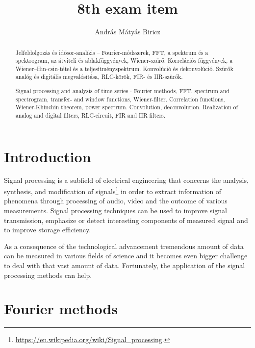 \documentclass[12pt]{article}
\theoremstyle{plain}
\begin{document}
\title{8th exam item}
\author{András Mátyás Biricz}

\maketitle


\begin{abstract}
    \centering

    Jelfeldolgozás és idősor-analízis – Fourier-módszerek, FFT, a spektrum és a spektrogram, az átviteli és ablakfüggvények, Wiener-szűrő. Korrelációs függvények, a Wiener–Hin-csin-tétel és a teljesítményspektrum. Konvolúció és dekonvolúció. Szűrők analóg és digitális megvalósítása, RLC-körök, FIR- és IIR-szűrők.

	Signal processing and analysis of time series - Fourier methods, FFT, spectrum and spectrogram, transfer- and window functions, Wiener-filter. Correlation functions, Wiener-Khinchin theorem, power spectrum. Convolution, deconvolution. Realization of analog and digital filters, RLC-circuit, FIR and IIR filters. 

\end{abstract}

\vfill

\tableofcontents

\newpage

\section{Introduction}

Signal processing is a subfield of electrical engineering that concerns the analysis, synthesis, and modification of signals\footnote{\url{https://en.wikipedia.org/wiki/Signal_processing}.} in order to extract information of phenomena through processing of audio, video and the outcome of various measurements. Signal processing techniques can be used to improve signal transmission, emphasize or detect interesting components of measured signal and to improve storage efficiency. 

As a consequence of the technological advancement tremendous amount of data can be measured in various fields of science and it becomes even bigger challenge to deal with that vast amount of data. Fortunately, the application of the signal processing methods can help.

\section{Fourier methods}
\end{document}
